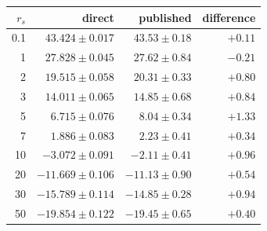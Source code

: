 \begin{tabular}{rrrr}
\toprule
$r_s$ & direct & published & difference\\
\midrule
0.1 & $43.424\pm0.017$ & $43.53\pm0.18$ & $+0.11$\\
1 & $27.828\pm0.045$ & $27.62\pm0.84$ & $-0.21$\\
2 & $19.515\pm0.058$ & $20.31\pm0.33$ & $+0.80$\\
3 & $14.011\pm0.065$ & $14.85\pm0.68$ & $+0.84$\\
5 & $6.715\pm0.076$ & $8.04\pm0.34$ & $+1.33$\\
7 & $1.886\pm0.083$ & $2.23\pm0.41$ & $+0.34$\\
10 & $-3.072\pm0.091$ & $-2.11\pm0.41$ & $+0.96$\\
20 & $-11.669\pm0.106$ & $-11.13\pm0.90$ & $+0.54$\\
30 & $-15.789\pm0.114$ & $-14.85\pm0.28$ & $+0.94$\\
50 & $-19.854\pm0.122$ & $-19.45\pm0.65$ & $+0.40$\\
\bottomrule
\end{tabular}
